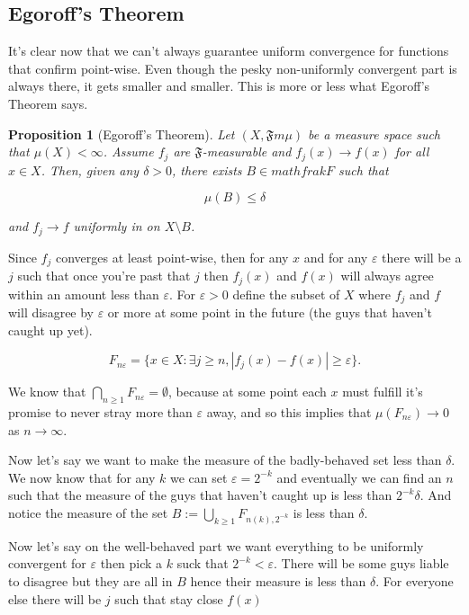 \documentclass[oneside]{book}
\newtheorem{proposition}[theorem]{Proposition}
\newenvironment{proof}[1][Proof]{\begin{trivlist}
\item[\hskip \labelsep {\bfseries #1}]}{\end{trivlist}}
\begin{document}
\subsection{Egoroff's Theorem}
It's clear now that we can't always guarantee uniform convergence for functions that confirm point-wise. Even though the pesky non-uniformly convergent part is always there, it gets smaller and smaller. This is more or less what Egoroff's Theorem says.

\begin{proposition}[Egoroff's Theorem]
Let $(X,\mathfrak{F}m\mu)$ be a measure space such that $\mu(X) < \infty$. Assume $f_j$ are $\mathfrak{F}$-measurable and $f_j(x) \to f(x)$ for all $x \in X$. Then, given any $\delta > 0$, there exists $B \in mathfrak{F}$ such that

\begin{equation}
\mu(B) \le \delta
\end{equation}

and $f_j \to f$ uniformly in on $X \setminus B$.
\end{proposition}

\begin{proof}
Since $f_j$ converges at least point-wise, then for any $x$ and for any $\varepsilon$ there will be a $j$ such that once you're past that $j$ then $f_j(x)$ and $f(x)$ will always agree within an amount less than $\varepsilon$. For $\varepsilon >0$ define the subset of $X$ where $f_j$ and $f$ will disagree by $\varepsilon$ or more at some point in the future (the guys that haven't caught up yet).

\begin{equation}
F_{n\varepsilon} = \{ x \in X: \exists j \ge n, |f_j(x)-f(x)| \ge \varepsilon \}.
\end{equation}

We know that $\bigcap_{n \ge 1} F_{n\varepsilon} = \emptyset$, because at some point each $x$ must fulfill it's promise to never stray more than $\varepsilon$ away, and so this implies that $\mu(F_{n\varepsilon}) \to 0$ as $n \to \infty$.

Now let's say we want to make the measure of the badly-behaved set less than $\delta$. We now know that for any $k$ we can set $\varepsilon = 2^{-k}$ and eventually we can find an $n$ such that the measure of the guys that haven't caught up is less than $2^{-k} \delta$. And notice the measure of the set $B := \bigcup_{k \ge 1} F_{n(k),2^{-k}}$ is less than $\delta$.

Now let's say on the well-behaved part we want everything to be uniformly convergent for $\varepsilon$ then pick a $k$ suck that $2^{-k} < \varepsilon$. There will be some guys liable to disagree but they are all in $B$ hence their measure is less than $\delta$. For everyone else there will be $j$ such that stay close $f(x)$

\end{proof}
\end{document}
